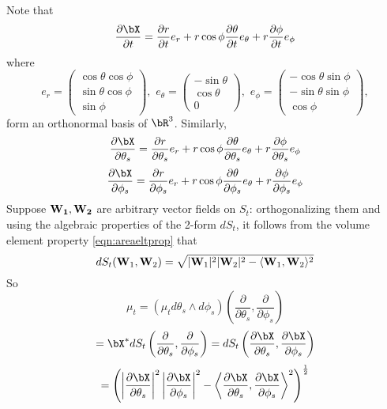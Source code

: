 Note that 
\begin{equation}
\label{eqn:drdt}
\frac{\partial \bX}{\partial t} = 
\frac{\partial r}{\partial t} e_r
+
r \cos \phi\frac{\partial \theta}{\partial t} e_{\theta}
+
r\frac{\partial \phi}{\partial t} e_{\phi}
\end{equation}
where
\[
e_r = 
\left(\begin{array}{c}
\cos \theta \cos \phi\\
\sin \theta \cos\phi\\
\sin \phi 
\end{array}\right),\,\,
e_{\theta}=\left(\begin{array}{c}
-\sin \theta \\
\cos \theta \\
0 
\end{array}\right),\,\,
e_{\phi}=\left(\begin{array}{c}
-\cos \theta \sin \phi\\
-\sin \theta \sin\phi\\
\cos \phi 
\end{array}\right),
\]
form an orthonormal basis of $\bR^3$. Similarly,
\begin{equation}
\label{eqn:drdtheta}
\frac{\partial \bX}{\partial \theta_s} = 
\frac{\partial r}{\partial \theta_s} e_r
+
r \cos \phi\frac{\partial \theta}{\partial \theta_s} e_{\theta}
+
r\frac{\partial \phi}{\partial \theta_s} e_{\phi}
\end{equation}
\begin{equation}
\label{eqn:drdphi}
\frac{\partial \bX}{\partial \phi_s} = 
\frac{\partial r}{\partial \phi_s} e_r
+
r \cos \phi\frac{\partial \theta}{\partial \phi_s} e_{\theta}
+
r\frac{\partial \phi}{\partial \phi_s} e_{\phi}
\end{equation}
Suppose ${\bf W_1},{\bf W_2}$ are arbitrary vector fields on $S_t$:
orthogonalizing them and using the algebraic properties of the 2-form
$dS_t$, it follows from the volume element property
\ref{eqn:areaeltprop} that 
\[
dS_t({\bf W}_1,{\bf W}_2) = \sqrt{|{\bf W}_{1}|^2|{\bf W}_2|^2 -
  \langle {\bf W}_1,{\bf W}_2\rangle^2}
\]
So 
\[
\mu_t = (\mu_t d\theta_s\wedge d\phi_s) \left(\frac{\partial}{\partial 
    \theta_s},\frac{\partial}{\partial \phi_s}\right)
\]
\[
= \bX^* dS_t \left(\frac{\partial}{\partial 
    \theta_s},\frac{\partial}{\partial \phi_s}\right) = dS_t
\left(\frac{\partial \bX}{\partial 
    \theta_s},\frac{\partial \bX}{\partial \phi_s}\right)
\]
\[
= \left(\left|\frac{\partial \bX}{\partial 
    \theta_s}\right|^2\left|\frac{\partial \bX}{\partial 
    \phi_s}\right|^2 - \left\langle \frac{\partial \bX}{\partial 
    \theta_s}, \frac{\partial \bX}{\partial \phi_s}\right\rangle^2
\right)^{\frac{1}{2}}
\]
